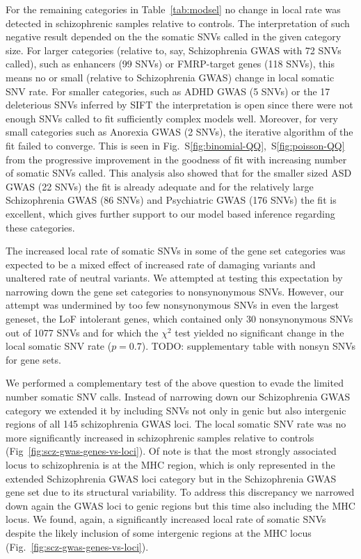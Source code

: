 \documentclass[letterpaper]{article}
\begin{document}
For the remaining categories in Table~\ref{tab:modsel} no change in local rate
was detected in schizophrenic samples relative to controls.  The
interpretation of such negative result depended on the the somatic SNVs called
in the given category size.  For larger categories (relative to, say,
Schizophrenia GWAS with 72 SNVs called), such as enhancers (99 SNVs) or
FMRP-target genes (118 SNVs), this means no or small (relative to
Schizophrenia GWAS) change in local somatic SNV rate.  For smaller categories,
such as ADHD GWAS (5 SNVs) or the 17 deleterious SNVs inferred by SIFT the
interpretation is open since there were not enough SNVs called to fit
sufficiently complex models well.  Moreover, for very small categories such as
Anorexia GWAS (2 SNVs), the iterative algorithm of the fit failed to converge.
This is seen in Fig.~S\ref{fig:binomial-QQ},~S\ref{fig:poisson-QQ} from the
progressive improvement in the goodness of fit with increasing number of
somatic SNVs called.  This analysis also showed that for the smaller sized ASD
GWAS (22 SNVs) the fit is already adequate and for the relatively large
Schizophrenia GWAS (86 SNVs) and Psychiatric GWAS (176 SNVs) the fit is
excellent, which gives further support to our model based inference regarding
these categories.

The increased local rate of somatic SNVs in some of the gene set categories
was expected to be a mixed effect of increased rate of damaging variants and
unaltered rate of neutral variants. We attempted at testing this expectation
by narrowing down the gene set categories to nonsynonymous SNVs.  However, our
attempt was undermined by too few nonsynonymous SNVs in even the largest
geneset, the LoF intolerant genes, which contained only 30 nonsynonymous SNVs
out of 1077 SNVs and for which the $\chi^2$ test yielded no significant
change in the local somatic SNV rate ($p = 0.7$).  TODO: supplementary table
with nonsyn SNVs for gene sets.

We performed a complementary test of the above question to evade the limited
number somatic SNV calls.  Instead of narrowing down our Schizophrenia GWAS
category we extended it by including SNVs not only in genic but also
intergenic regions of all 145 schizophrenia GWAS loci.  The local somatic SNV
rate was no more significantly increased in schizophrenic samples relative to
controls (Fig~\ref{fig:scz-gwas-genes-vs-loci}).  Of note is that the most
strongly associated locus to schizophrenia is at the MHC region, which is only
represented in the extended Schizophrenia GWAS loci category but in the
Schizophrenia GWAS gene set due to its structural variability.  To address
this discrepancy we narrowed down again the GWAS loci to genic regions but
this time also including the MHC locus.  We found, again, a significantly
increased local rate of somatic SNVs despite the likely inclusion of some
intergenic regions at the MHC locus (Fig.~\ref{fig:scz-gwas-genes-vs-loci}).
\end{document}
